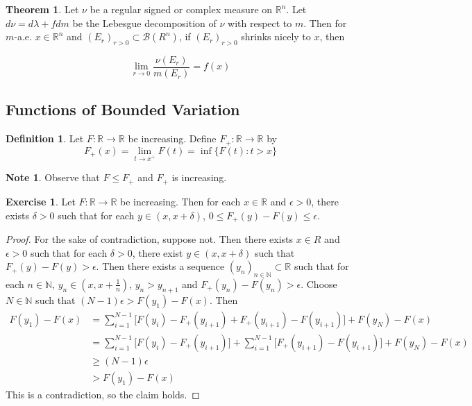\documentclass[12pt]{amsart}
\theoremstyle{definition}
\newtheorem{defn}[definition]{Definition}
\newtheorem{note}[definition]{Note}
\newtheorem{thm}[definition]{Theorem}
\newtheorem{ex}[definition]{Exercise}
\newcommand{\del}{\delta}
\newcommand{\lam}{\lambda}
\newcommand{\ep}{\epsilon}
\newcommand{\N}{\mathbb{N}}
\newcommand{\R}{\mathbb{R}}
\newcommand{\MB}{\mathcal{B}}
\newcommand{\lex}[1]{\label{ex:#1}}
\newcommand{\ld}[1]{\label{defn:#1}}
\begin{document}
	\begin{thm}
		Let $\nu$ be a regular signed or complex measure on $\R^n$. Let $d\nu = d\lam + f dm$ be the Lebesgue decomposition of $\nu$ with respect to $m$. Then for $m$-a.e. $x \in \R^n$ and $(E_r)_{r >0} \subset \MB(R^n)$, if $(E_r)_{r >0}$ shrinks nicely to $x$, then 
		
		$$\lim_{r \rightarrow 0} \frac{\nu(E_r)}{m(E_r)} = f(x)$$
	\end{thm}
	
	
	
	
	
	
	
	
	
	
	
	
	
	
	
	
	\newpage
	\subsection{Functions of Bounded Variation}
	
	\begin{defn} \ld{00000} 
		Let $F:\R \rightarrow \R$ be increasing. Define $F_+:\R \rightarrow \R$ by $$F_+(x) = \lim_{t \rightarrow x^+}F(t) = \inf \{F(t): t>x \}$$
	\end{defn}
	
	\begin{note}
		Observe that $F \leq F_+$ and $F_+$ is increasing.
	\end{note}
	
	\begin{ex} \lex{00000} 
		Let $F:\R \rightarrow \R$ be increasing. Then for each $x \in \R$ and $ \ep>0$, there exists $\del >0$ such that for each $y \in (x,x+\del)$, $0 \leq F_+(y) - F(y) \leq \ep$.
	\end{ex}
	
	\begin{proof}
		For the sake of contradiction, suppose not. Then there exists $x \in R$ and $\ep >0$ such that for each $\del >0$, there exist $y \in (x,x+\del)$ such that $F_+(y) - F(y) > \ep$. Then there exists a sequence $(y_n)_{n \in \N} \subset \R$ such that for each $n \in \N$, $y_n \in (x, x+\frac{1}{n})$, $y_n > y_{n+1}$ and $F_+(y_n) - F(y_n) > \ep$. Choose $N \in \N$ such that $(N-1)\ep > F(y_1) - F(x)$. Then 
		\begin{align*}
			F(y_1) - F(x) 
			&= \sum_{i=1}^{N-1} \bigg[F(y_i)-F_+(y_{i+1}) + F_+(y_{i+1}) - F(y_{i+1}) \bigg] + F(y_N)- F(x)\\
			& = \sum_{i=1}^{N-1} \bigg[F(y_i)-F_+(y_{i+1}) \bigg] + \sum_{i=1}^{N-1} \bigg[ F_+(y_{i+1}) - F(y_{i+1}) \bigg] + F(y_N)- F(x) \\
			& \geq (N-1)\ep \\
			& > F(y_1) - F(x)
		\end{align*}
		This is a contradiction, so the claim holds.
	\end{proof}
	
\end{document}
